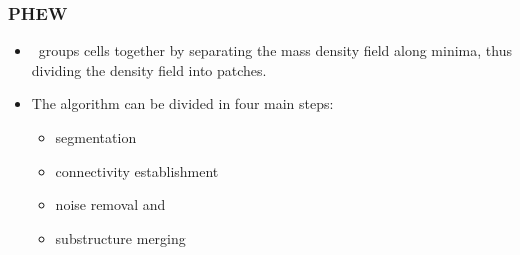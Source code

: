 \begin{frame}
	\frametitle{PHEW}
	
			\begin{itemize}
				\item \phew\ groups cells together by separating the mass density field along minima, thus dividing the density field into patches.
				
				
				\item The algorithm can	be divided in four main steps:
				
				\begin{itemize}
					\item segmentation
					\item connectivity establishment
					\item noise removal and
					\item substructure merging
				\end{itemize}
			\end{itemize}
	  
\end{frame}


